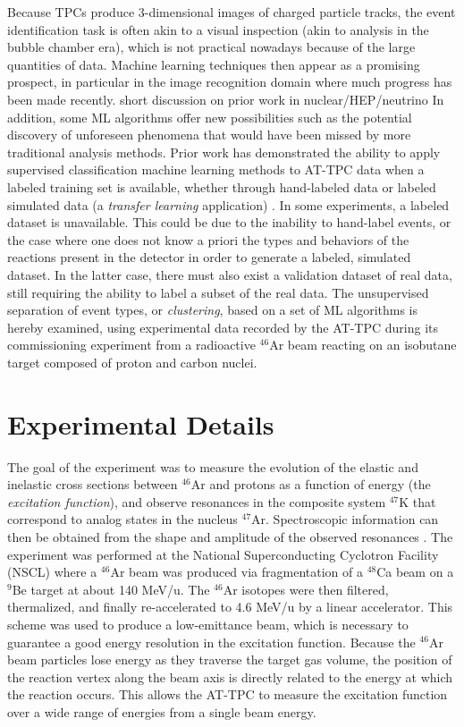 \documentclass[review,number,sort&compress]{elsarticle}
\begin{document}
Because TPCs produce 3-dimensional images of charged particle tracks, the event identification task is often akin to a visual inspection (akin to analysis in the bubble chamber era), which is not practical nowadays because of the large quantities of data. Machine learning techniques then appear as a promising prospect, in particular in the image recognition domain where much progress has been made recently. {\color{blue} short discussion on prior work in nuclear/HEP/neutrino} In addition, some ML algorithms offer new possibilities such as the potential discovery of unforeseen phenomena that would have been missed by more traditional analysis methods. Prior work has demonstrated the ability to apply supervised classification machine learning methods to AT-TPC data when a labeled training set is available, whether through hand-labeled data or labeled simulated data (a {\em transfer learning} application) \cite{Kuchera2019}. In some experiments, a labeled dataset is unavailable. This could be  due to the inability to hand-label events, or the case where one does not know a priori the types and behaviors of the reactions present in the detector in order to generate a labeled, simulated dataset. In the latter case, there must also exist a validation dataset of real data, still requiring the ability to label a subset of the real data. The unsupervised separation of event types, or {\em clustering}, based on a set of ML algorithms is hereby examined, using experimental data recorded by the AT-TPC during its commissioning experiment from a radioactive $^{46}$Ar beam reacting on an isobutane target composed of proton and carbon nuclei. 

\section{Experimental Details} 
The goal of the experiment was to measure the evolution of the elastic and inelastic cross sections between $^{46}$Ar and protons as a function of energy (the {\em excitation function}), and observe resonances in the composite system $^{47}$K that correspond to analog states in the nucleus $^{47}$Ar. Spectroscopic information can then be obtained from the shape and amplitude of the observed resonances \cite{Bradt2018}. 
The experiment was performed at the National Superconducting Cyclotron Facility (NSCL) where a $^{46}$Ar beam was produced via fragmentation of a $^{48}$Ca beam on a $^9$Be target at about 140 MeV/u. The $^{46}$Ar isotopes were then filtered, thermalized, and finally re-accelerated to 4.6 MeV/u by a linear accelerator. This scheme was used to produce a low-emittance beam, which is necessary to guarantee a good energy resolution in the excitation function. Because the  $^{46}$Ar beam particles lose energy as they traverse the target gas volume, the position of the reaction vertex along the beam axis is directly related to the energy at which the reaction occurs. This allows the AT-TPC to measure the excitation function over a wide range of energies from a single beam energy.
\end{document}
